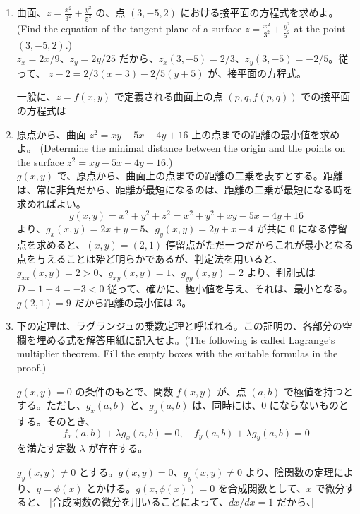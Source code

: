 \begin{enumerate}
\item 曲面、${\displaystyle z = \frac{x^2}{3^2} + \frac{y^2}{5^2}}$ の、点 $(3,-5,2)$ における接平面の方程式を求めよ。(Find the equation of the tangent plane of a surface 
${\displaystyle z = \frac{x^2}{3^2} + \frac{y^2}{5^2}}$ at the point $(3,-5,2)$.)\\
\sol 
$z_x = 2x/9$、$z_y = 2y/25$ だから、$z_x(3,-5) = 2/3$、$z_y(3,-5) = -2/5$。従って、
$z - 2 = 2/3(x-3) -2/5(y+5)$ が、接平面の方程式。

一般に、$z = f(x,y)$ で定義される曲面上の点 $(p,q,f(p,q))$ での接平面の方程式は


\item 原点から、曲面 $z^2 = xy - 5x - 4y + 16$ 上の点までの距離の最小値を求めよ。
(Determine the minimal distance between the origin and the points on the surface 
$z^2 = xy - 5x - 4y + 16$.)\\
\sol
$g(x,y)$ で、原点から、曲面上の点までの距離の二乗を表すとする。距離は、常に非負だから、距離が最短になるのは、距離の二乗が最短になる時を求めればよい。
$$g(x,y) = x^2 + y^2 + z^2 = x^2 + y^2 + xy - 5x - 4y + 16$$
より、$g_x(x,y) = 2x + y - 5$、$g_y(x,y) = 2y + x - 4$ が共に $0$ になる停留点を求めると、$(x,y) = (2,1)$ 停留点がただ一つだからこれが最小となる点を与えることは殆ど明らかであるが、判定法を用いると、$g_{xx}(x,y) = 2 > 0$、$g_{xy}(x,y) = 1$、$g_{yy}(x,y) = 2$ より、判別式は $D = 1 - 4 = -3<0$ 従って、確かに、極小値を与え、それは、最小となる。$g(2,1) = 9$ だから距離の最小値は $3$。

\item 下の定理は、ラグランジュの乗数定理と呼ばれる。この証明の、各部分の空欄を埋める式を解答用紙に記入せよ。(The following is called Lagrange's multiplier theorem. Fill the empty boxes with the suitable formulas in the proof.)
\begin{thm}
$g(x,y) = 0$ の条件のもとで、関数 $f(x,y)$ が、点 $(a,b)$ で極値を持つとする。ただし、$g_x(a,b)$ と、$g_y(a,b)$ は、同時には、$0$ にならないものとする。そのとき、
$$f_x(a,b) + \lambda g_x(a,b) = 0,\quad f_y(a,b) + \lambda g_y(a,b) = 0$$
を満たす定数 $\lambda$ が存在する。
\end{thm}
\proof
$g_y(x,y) \neq 0$ とする。$g(x,y) = 0$、$g_y(x,y) \neq 0$ より、陰関数の定理により、$y = \phi(x)$ とかける。$g(x,\phi(x)) = 0$  を合成関数として、$x$ で微分すると、
[合成関数の微分を用いることによって、$dx/dx = 1$ だから、]


\end{enumerate}
